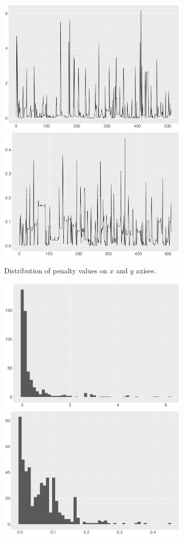 

\begin{figure}
    \centering
    \begin{subfigure}{\textwidth}
    \centering
    \includegraphics[width=0.45\linewidth]{Chapters/02TractorSplineTheory/plot/ggplot/ggRealdataXPenaltyLine.pdf}
    \includegraphics[width=0.45\linewidth]{Chapters/02TractorSplineTheory/plot/ggplot/ggRealdataYPenaltyLine.pdf}
    \caption{Distribution of penalty values on $x$ and $y$ axises. }
    \end{subfigure}
    \begin{subfigure}{\textwidth}
    \centering
    \includegraphics[width=0.45\linewidth]{Chapters/02TractorSplineTheory/plot/ggplot/ggRealdataXPenaltyHist.pdf}
    \includegraphics[width=0.45\linewidth]{Chapters/02TractorSplineTheory/plot/ggplot/ggRealdataYPenaltyHist.pdf}

\end{subfigure}
\end{figure}
